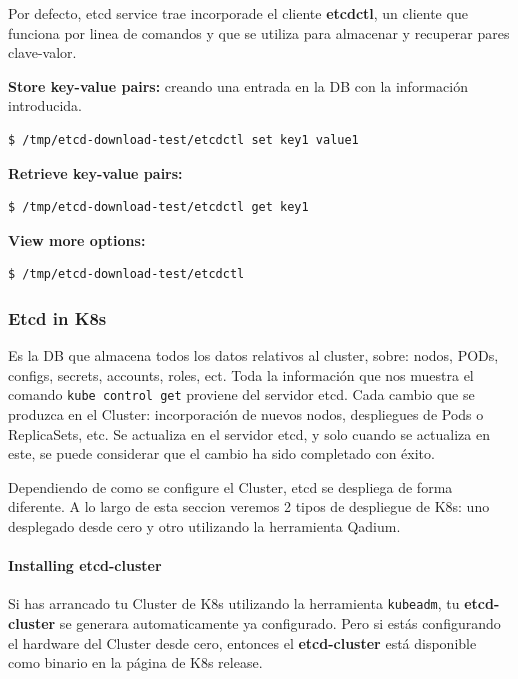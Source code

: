 \documentclass{article}
\newenvironment{codetemplate}[1][]{%
  \mybasecolorbox[#1]
  \itshape
}{%
  \endmybasecolorbox
}
\begin{document}
Por defecto, etcd service trae incorporade el cliente \textbf{etcdctl}, un cliente que funciona por linea de comandos y que se utiliza para almacenar y recuperar pares clave-valor.

\textbf{Store key-value pairs:} creando una entrada en la DB con la información introducida.
\begin{codetemplate}{}
\begin{verbatim}
$ /tmp/etcd-download-test/etcdctl set key1 value1
\end{verbatim}
\end{codetemplate}

\textbf{Retrieve key-value pairs:}
\begin{codetemplate}{}
\begin{verbatim}
$ /tmp/etcd-download-test/etcdctl get key1
\end{verbatim}
\end{codetemplate}

\textbf{View more options:}
\begin{codetemplate}{}
\begin{verbatim}
$ /tmp/etcd-download-test/etcdctl
\end{verbatim}
\end{codetemplate}

\subsubsection{Etcd in K8s}

Es la DB que almacena todos los datos relativos al cluster, sobre: nodos, PODs, configs, secrets, accounts, roles, ect. Toda la información que nos muestra el comando \verb|kube control get| proviene del servidor etcd. Cada cambio que se produzca en el Cluster: incorporación de nuevos nodos, despliegues de Pods o ReplicaSets, etc. Se actualiza en el servidor etcd, y solo cuando se actualiza en este, se puede considerar que el cambio ha sido completado con éxito.

Dependiendo de como se configure el Cluster, etcd se despliega de forma diferente. A lo largo de esta seccion veremos 2 tipos de despliegue de K8s: uno desplegado desde cero y otro utilizando la herramienta Qadium.

\paragraph{Installing etcd-cluster}

Si has arrancado tu Cluster de K8s utilizando la herramienta \verb|kubeadm|, tu \textbf{etcd-cluster} se generara automaticamente ya configurado. Pero si estás configurando el hardware del Cluster desde cero, entonces el \textbf{etcd-cluster} está disponible como binario en la página de K8s release.
\end{document}
